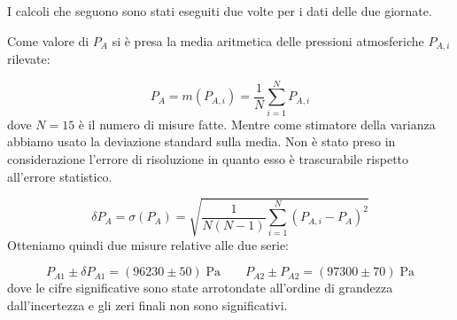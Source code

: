 I calcoli che seguono sono stati eseguiti due volte per i dati delle due giornate.

Come valore di $P_A$ si è presa la media aritmetica delle pressioni atmosferiche $P_{A,i}$ rilevate:

\begin{equation}
    P_A = m(P_{A,i}) = \frac{1}{N}\sum_{i=1}^N P_{A,i}
\end{equation}
%
dove $N = 15$ è il numero di misure fatte. Mentre come stimatore della varianza abbiamo usato la deviazione standard sulla media.
Non è stato preso in considerazione l'errore di risoluzione in quanto esso è trascurabile rispetto all'errore statistico. 

\begin{equation}
    \delta P_A = \sigma(P_{A}) = \sqrt{\frac{1}{N(N-1)}\sum_{i=1}^N (P_{A,i} - P_A)^2}
\end{equation}
%
Otteniamo quindi due misure relative alle due serie:

\begin{equation}
    P_{A1} \pm \delta P_{A1} = (96230 \pm 50) \; \si{\pascal} \qquad P_{A2} \pm P_{A2} = (97300 \pm 70) \; \si{\pascal}
    \label{eq:pa}
\end{equation}
%
dove le cifre significative sono state arrotondate all'ordine di grandezza dall'incertezza e gli zeri finali non sono significativi.

%
%
%
%

